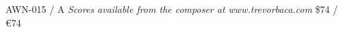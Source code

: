 \documentclass{article}
\begin{document}
\null \vfill

AWN-015 / A \hfill
\textit{Scores available from the composer at www.trevorbaca.com}
\hfill \$74 / \euro 74
\end{document}
